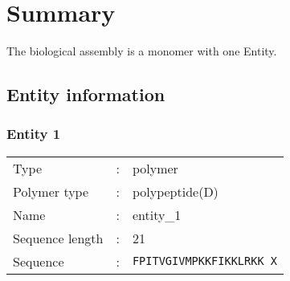 \newpage
\pagestyle{fancy}
\renewcommand{\footrulewidth}{0pt}
\section{Summary}
The biological assembly is a monomer with one Entity.\\
\subsection{ Entity information}
\subsubsection{ Entity 1 }
\begin{longtable}{l l l}
Type &:& polymer\\
Polymer type &:& polypeptide(D)\\
Name &:& entity\_1\\
Sequence length &:& 21\\
Sequence &:& \multicolumn{1}{p{0.25\linewidth}}{\texttt{FPITVGIVMPKKFIKKLRKK X}}\\
\end{longtable}

